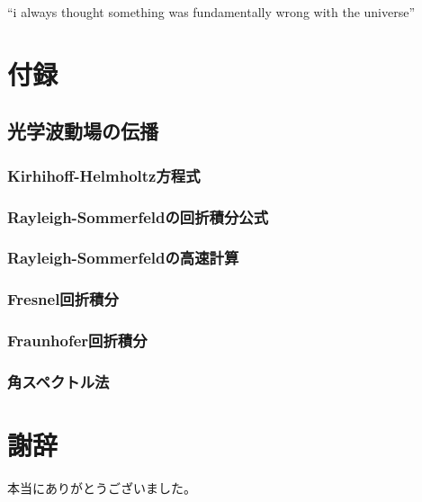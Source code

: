 \documentclass[dvipdfmx,autodetect-engine]{jreport}
\begin{document}
\newpage
``i always thought something was fundamentally wrong with the universe'' \citep{adams1995hitchhiker}


\newpage
\chapter{付録}
\minitoc

\section{光学波動場の伝播}
\subsection{Kirhihoff-Helmholtz方程式}

\subsection{Rayleigh-Sommerfeldの回折積分公式}

\subsection{Rayleigh-Sommerfeldの高速計算}

\subsection{Fresnel回折積分}

\subsection{Fraunhofer回折積分}

\subsection{角スペクトル法}

\newpage



\chapter*{謝辞}
本当にありがとうございました。
\end{document}
